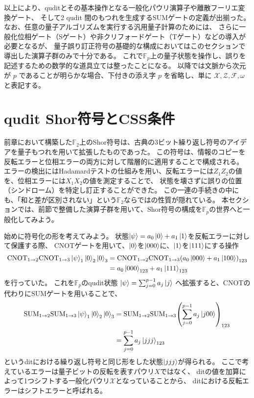 \documentclass[../master.tex]{subfiles}
\begin{document}
以上により、quditとその基本操作となる一般化パウリ演算子や離散フーリエ変換ゲート、
そして2 qudit 間のもつれを生成するSUMゲートの定義が出揃った。
なお、任意の量子アルゴリズムを実行する汎用量子計算のためには、
さらに一般化位相ゲート（Sゲート）や非クリフォードゲート（Tゲート）などの導入が必要となるが、
量子誤り訂正符号の基礎的な構成においてはこのセクションで導出した演算子群のみで十分である。
これで$\mathbb{F}_p$上の量子状態を操作し、誤りを記述するための数学的な道具立ては整ったことになる。
以降では文脈から次元が $p$ であることが明らかな場合、下付きの添え字 $p$ を省略し、単に $\mathcal{X}, \mathcal{Z}, \mathcal{F}, \omega$ と表記する。

\section{qudit Shor符号とCSS条件}
前章において構築した$\mathbb{F}_2$上のShor符号は、古典の3ビット繰り返し符号のアイデアを量子もつれを用いて拡張したものであった。
この符号は、情報のコピーを反転エラーと位相エラーの両方に対して階層的に適用することで構成される。
エラーの検出にはHadamardテストの仕組みを用い、反転エラーには$Z_1Z_2$の値を、位相エラーには$X_1X_2$の値を測定することで、
状態を壊さずに誤りの位置（シンドローム）を特定し訂正することができた。
この一連の手続きの中にも、「和と差が区別されない」という$\mathbb{F}_2$ならではの性質が隠れている。
本セクションでは、前節で整備した演算子群を用いて、Shor符号の構成を$\mathbb{F}_p$の世界へと一般化してみよう。

始めに符号化の形を考えてみよう。
状態$\ket{\psi}=a_0\ket{0}+a_1\ket{1}$を反転エラーに対して保護する際、
CNOTゲートを用いて、$\ket{0}$を$\ket{000}$に、$\ket{1}$を$\ket{111}$にする操作
\begin{equation}\begin{aligned}[b]
    \text{CNOT}_{1\to 2}\text{CNOT}_{1\to 3}\ket{\psi}_1\ket{0}_2\ket{0}_3
    &= \text{CNOT}_{1\to 2}\text{CNOT}_{1\to 3}\qty(a_0\ket{000}+ a_1\ket{100})_{123} \\
    &= a_0\ket{000}_{123} + a_1\ket{111}_{123}
\end{aligned}\end{equation}
を行っていた。
これを$\mathbb{F}_p$のqudit状態 $\ket{\psi} = \sum_{j=0}^{p-1} a_j\ket{j}$ へ拡張すると、CNOTの代わりにSUMゲートを用いることで、
\begin{equation}\begin{aligned}[b]
    \text{SUM}_{1\to 2}\text{SUM}_{1\to 3}\ket{\psi}_1\ket{0}_2\ket{0}_3
    &= \text{SUM}_{1\to 2}\text{SUM}_{1\to 3}\qty(\sum_{j=0}^{p-1} a_j \ket{j00})_{123} \\
    &= \sum_{j=0}^{p-1} a_j \ket{jjj}_{123}
\end{aligned}\end{equation}
というditにおける繰り返し符号と同じ形をした状態$\ket{jjj}$が得られる。
ここで考えているエラーは量子ビットの反転を表すパウリ$X$ではなく、
ditの値を加算によって1つシフトする一般化パウリ$\mathcal{X}$となっていることから、
ditにおける反転エラーはシフトエラーと呼ばれる。
\end{document}
